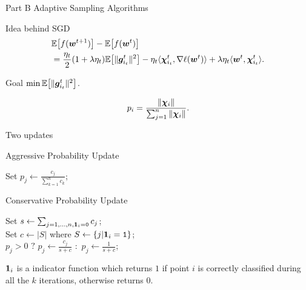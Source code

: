 \begin{frame}{Part B}
Adaptive Sampling Algorithms
\end{frame}

\begin{frame}{Idea behind SGD}
\begin{align*}
 &\mathbb{E}\big[f(\bm{w}^{t+1})\big] - \mathbb{E}\big[f(\bm{w}^{t})\big] \\
   &= \frac{\eta_t}{2}(1+\lambda \eta_t)\mathbb{E}\big[\|\bm{g}_{i_t}^t\|^2\big] - \eta_t \langle \bm{\chi}_{i_t}^t, \nabla \ell(\bm{w}^{t})\rangle + \lambda \eta_t \langle \bm{w}^{t}, \bm{\chi}_{i_t}^t \rangle.
\end{align*}

\begin{block}{Goal}
$\min \mathbb{E}\big[\|\bm{g}_{i_t}^t\|^2\big]$.
 \end{block}
\begin{equation}\label{eq:p_optimal}
    p_i = \frac{\|\bm{\chi}_i\|}{\sum_{j=1}^n \|\bm{\chi}_i\|}.
\end{equation}
\end{frame}

\begin{frame}{Two updates}
\begin{algorithm}[H]
    \label{alg:AggUpdate}
    \caption{Aggressive Probability Update}
    \SetAlgoLined
     {
	Set $p_j \leftarrow \frac{c_j}{\sum_{k=1}^n c_k}$;
    }
    \end{algorithm}
\begin{algorithm}[H]    
    \label{alg:ConUpdate}
    \caption{Conservative Probability Update}
    \SetAlgoLined
    Set $s \leftarrow \sum_{j=1,\dots, n, \bm{1}_i=\texttt{0}} c_j$; \\
    Set $c \leftarrow |S|$ where $S \leftarrow \{j | \bm{1}_i=\texttt{1}\}$; \\
     {
	    $p_j>0$ $?$ {$p_j \leftarrow \frac{c_j}{s+c}$} $\colon$ {$p_j \leftarrow \frac{1}{s+c}$; } 
    } 
\end{algorithm} 
\Tiny $\bm{1}_i$ is a indicator function which returns $1$ if point $i$ is correctly classified during all the $k$ iterations, otherwise returns $0$.
\end{frame}

